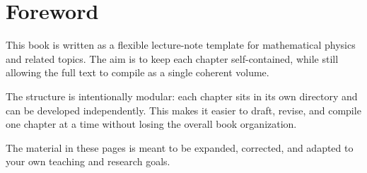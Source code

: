 \chapter*{Foreword}

This book is written as a flexible lecture-note template for mathematical physics and related topics. The aim is to keep each chapter self-contained, while still allowing the full text to compile as a single coherent volume.

The structure is intentionally modular: each chapter sits in its own directory and can be developed independently. This makes it easier to draft, revise, and compile one chapter at a time without losing the overall book organization.

The material in these pages is meant to be expanded, corrected, and adapted to your own teaching and research goals.
